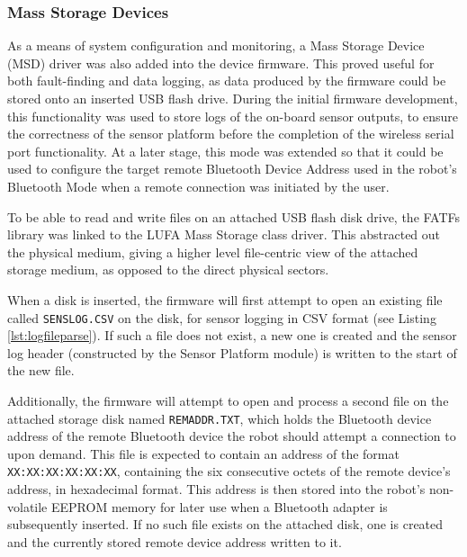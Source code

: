 \FloatBarrier
\subsubsection{Mass Storage Devices}

As a means of system configuration and monitoring, a Mass Storage Device (MSD) driver was also added into the device firmware. This proved useful for both fault-finding and data logging, as data produced by the firmware could be stored onto an inserted USB flash drive. During the initial firmware development, this functionality was used to store logs of the on-board sensor outputs, to ensure the correctness of the sensor platform before the completion of the wireless serial port functionality. At a later stage, this mode was extended so that it could be used to configure the target remote Bluetooth Device Address used in the robot's Bluetooth Mode when a remote connection was initiated by the user.

To be able to read and write files on an attached USB flash disk drive, the FATFs library was linked to the LUFA Mass Storage class driver. This abstracted out the physical medium, giving a higher level file-centric view of the attached storage medium, as opposed to the direct physical sectors.

When a disk is inserted, the firmware will first attempt to open an existing file called \texttt{SENSLOG.CSV} on the disk, for sensor logging in CSV format (see Listing \ref{lst:logfileparse}). If such a file does not exist, a new one is created and the sensor log header (constructed by the Sensor Platform module) is written to the start of the new file.



Additionally, the firmware will attempt to open and process a second file on the attached storage disk named \texttt{REMADDR.TXT}, which holds the Bluetooth device address of the remote Bluetooth device the robot should attempt a connection to upon demand. This file is expected to contain an address of the format \texttt{XX:XX:XX:XX:XX:XX}, containing the six consecutive octets of the remote device's address, in hexadecimal format. This address is then stored into the robot's non-volatile EEPROM memory for later use when a Bluetooth adapter is subsequently inserted. If no such file exists on the attached disk, one is created and the currently stored remote device address written to it.

